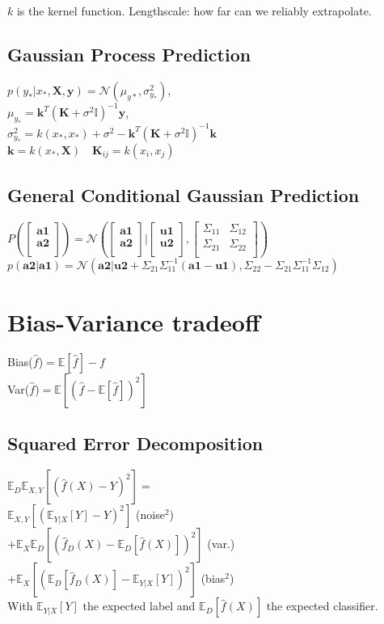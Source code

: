 $k$ is the kernel function. Lengthscale: how far can we reliably extrapolate.
\subsection*{Gaussian Process Prediction}
$p(y_*|x_*,\mathbf{X},\mathbf{y}) = \mathcal{N}(\mu_{y*},\sigma^2_{y_*})$,\\
$\mu_{y_*}=\mathbf{k}^T(\mathbf{K}+\sigma^2\mathbb{I})^{-1}\mathbf{y}$,\\
$\sigma^2_{y_*}=k(x_*,x_*){+}\sigma^2-\mathbf{k}^T(\mathbf{K}+\sigma^2\mathbb{I})^{-1}\mathbf{k}$\\
$\mathbf{k}=k(x_*,\mathbf{X})\quad \mathbf{K}_{ij}=k(x_i,x_j)$

\subsection*{General Conditional Gaussian Prediction}
$P(\begin{bmatrix}
\mathbf{a1}\\
\mathbf{a2}\\
\end{bmatrix}){=}\mathcal{N}(\begin{bmatrix}
\mathbf{a1}\\
\mathbf{a2}\\
\end{bmatrix}|\begin{bmatrix}
\mathbf{u1}\\
\mathbf{u2}\\
\end{bmatrix},\begin{bmatrix}
\Sigma_{11} & \Sigma_{12} \\
\Sigma_{21} & \Sigma_{22}\\
\end{bmatrix})$\\
 $p(\mathbf{a2}|\mathbf{a1}) =  \mathcal{N}(\mathbf{a2}|\mathbf{u2}+\Sigma_{21} \Sigma_{11}^{-1}(\mathbf{a1}-\mathbf{u1}), \Sigma_{22}- \Sigma_{21} \Sigma_{11}^{-1} \Sigma_{12})$


\section*{Bias-Variance tradeoff}
Bias($\hat{f}$)$=\mathbb{E}[\hat{f}]-f$\\
Var($\hat{f}$)$=\mathbb{E}[(\hat{f}-\mathbb{E}[\hat{f}])^2]$
\subsection*{Squared Error Decomposition}
$\mathbb{E}_D\mathbb{E}_{X,Y}[(\hat{f}(X)-Y)^2]=$\\
$\mathbb{E}_{X,Y}[(\mathbb{E}_{Y|X}[Y]-Y)^2]$ (noise$^2$)\\
$+\mathbb{E}_X\mathbb{E}_D[(\hat{f}_D(X)-\mathbb{E}_D[\hat{f}(X)])^2]$ (var.)\\
$+\mathbb{E}_X[(\mathbb{E}_D[\hat{f}_D(X)]-\mathbb{E}_{Y|X}[Y])^2]$ (bias$^2$)\\
With $\mathbb{E}_{Y|X}[Y]$ the expected label and $\mathbb{E}_{D}[\hat{f}(X)]$ the expected classifier.